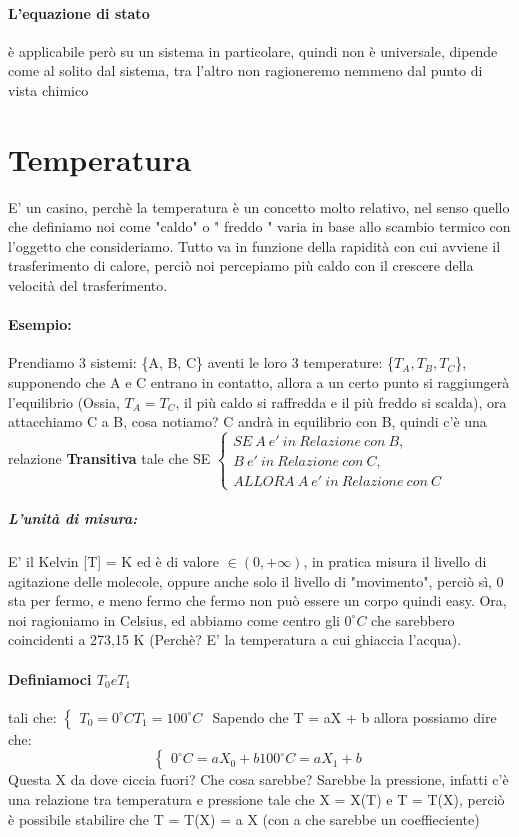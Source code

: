 \documentclass[12pt, a4paper, openany, oneside]{book}
\begin{document}
\paragraph{L'equazione di stato} è applicabile però su un sistema in particolare,
quindi non è universale, dipende come al solito dal sistema, tra l'altro non 
ragioneremo nemmeno dal punto di vista chimico
\section{Temperatura}
E' un casino, perchè la temperatura è un concetto molto relativo, nel senso
quello che definiamo noi come "\color{red}caldo\color{black}" o "\color{blue} 
freddo\color{black}
" varia in base allo scambio termico con l'oggetto che consideriamo. Tutto va in
funzione della rapidità con cui avviene il trasferimento di calore, perciò noi
percepiamo più caldo con il crescere della velocità del trasferimento. 
\paragraph{Esempio: }
Prendiamo 3 sistemi: \{A, B, C\} aventi le loro 3 temperature: \{$T_{A}, T_{B}
, T_{C}$\}, supponendo che A e C entrano in contatto, allora a un certo punto
si raggiungerà l'equilibrio (Ossia, $T_{A} = T_{C}$, il più caldo si raffredda
e il più freddo si scalda), ora attacchiamo C a B, 
cosa notiamo? C andrà in equilibrio con B, quindi c'è una relazione \textbf{
Transitiva
} tale che SE $
\begin{cases}
SE ~ A ~ e' ~ in ~ Relazione ~ con ~ B, \\B ~ e' ~ in ~ Relazione ~ con ~
C, \\ALLORA ~ A ~ e' ~ in ~ Relazione ~ con ~ C 
\end{cases}$ 
\subparagraph{L'unità di misura: }E' il Kelvin [T] = K ed è di valore $\in (0, 
+\infty)$, in pratica misura il livello di agitazione delle molecole, oppure 
anche solo il livello di "movimento", perciò sì, 0 sta per fermo, e meno fermo
che fermo non può essere un corpo quindi easy. 
Ora, noi ragioniamo in Celsius, ed abbiamo come centro gli $0^{\circ}C$ 
che sarebbero 
coincidenti a 273,15 K (Perchè? E' la temperatura a cui ghiaccia l'acqua). 
\paragraph{Definiamoci $T_{0} e T_{1}$} tali che:
$
\begin{cases}
T_{0} = 0^{\circ}C	
T_{1} = 100^{\circ}C
\end{cases}
$
Sapendo che T = aX + b allora possiamo dire che:
\[
\begin{cases}
0^{\circ}C	= a X_{0} + b
100^{\circ}C = a X_{1} + b
\end{cases}
\]
Questa X da dove ciccia fuori? Che cosa sarebbe? Sarebbe la pressione, infatti
c'è una relazione tra temperatura e pressione tale che X = X(T) e T = T(X),
perciò è possibile stabilire che T = T(X) = a X (con a che sarebbe un coeffieciente)
\end{document}
